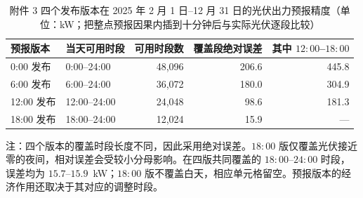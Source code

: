 \begin{table}[htbp]
  \centering
  \caption{附件 3 四个发布版本在 2025 年 2 月 1 日--12 月 31 日的光伏出力预报精度（单位：kW；把整点预报因果内插到十分钟后与实际光伏逐段比较）}
  \label{tab:p3-skill}
  \small
  \begin{tabular}{llrrr}
    \toprule
    预报版本 & 当天可用时段 & 可用时段数 & 覆盖段绝对误差 & 其中 $12{:}00$--$18{:}00$ \\
    \midrule
    0{:}00 发布 & 0{:}00--24{:}00 & 48,096 & 206.6 & 445.8 \\
    6{:}00 发布 & 6{:}00--24{:}00 & 36,072 & 180.0 & 304.9 \\
    12{:}00 发布 & 12{:}00--24{:}00 & 24,048 & 98.6 & 181.3 \\
    18{:}00 发布 & 18{:}00--24{:}00 & 12,024 & 15.9 & --- \\
    \bottomrule
  \end{tabular}
  \par\vspace{2pt}
  \begin{minipage}{\textwidth}\footnotesize
    注：四个版本的覆盖时段长度不同，因此采用绝对误差。$18{:}00$ 版仅覆盖光伏接近零的夜间，相对误差会受较小分母影响。在四版共同覆盖的 $18{:}00$--$24{:}00$ 时段，误差均为 $15.7$--$15.9$~kW；$18{:}00$ 版不覆盖白天，相应单元格留空。预报版本的经济作用还取决于其对应的调整时段。
  \end{minipage}
\end{table}

